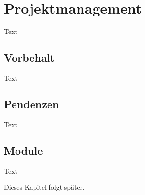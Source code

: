 
\clearpage
\section{Projektmanagement}

Text

\subsection{Vorbehalt}

Text

\subsection{Pendenzen}

Text

\subsection{Module}

Text

Dieses Kapitel folgt später.

